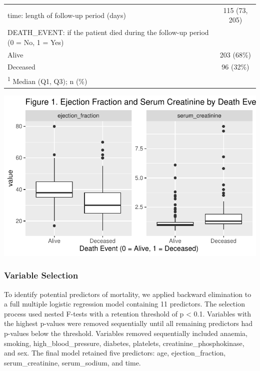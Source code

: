 \documentclass[
  letterpaper,
  DIV=11,
  numbers=noendperiod]{scrartcl}
\begin{document}
\begin{table}
\begin{tabular}[t]{lc}
time: length of follow-up period (days) & 115 (73, 205)\\
DEATH\_EVENT: if the patient died during the follow-up period (0 = No, 1 = Yes) & \\
\hspace{1em}Alive & 203 (68\%)\\
\hspace{1em}Deceased & 96 (32\%)\\
\bottomrule
\multicolumn{2}{l}{\rule{0pt}{1em}\textsuperscript{1} Median (Q1, Q3); n (\%)}\\
\end{tabular}
\end{table}

\includegraphics{SDS-291-final-project-report_files/figure-pdf/unnamed-chunk-3-1.pdf}

\hypertarget{variable-selection}{%
\subsubsection{Variable Selection}\label{variable-selection}}

To identify potential predictors of mortality, we applied backward
elimination to a full multiple logistic regression model containing 11
predictors. The selection process used nested F-tests with a retention
threshold of p \textless{} 0.1. Variables with the highest p-values were
removed sequentially until all remaining predictors had p-values below
the threshold. Variables removed sequentially included anaemia, smoking,
high\_blood\_pressure, diabetes, platelets, creatinine\_phosphokinase,
and sex. The final model retained five predictors: age,
ejection\_fraction, serum\_creatinine, serum\_sodium, and time.
\end{document}
